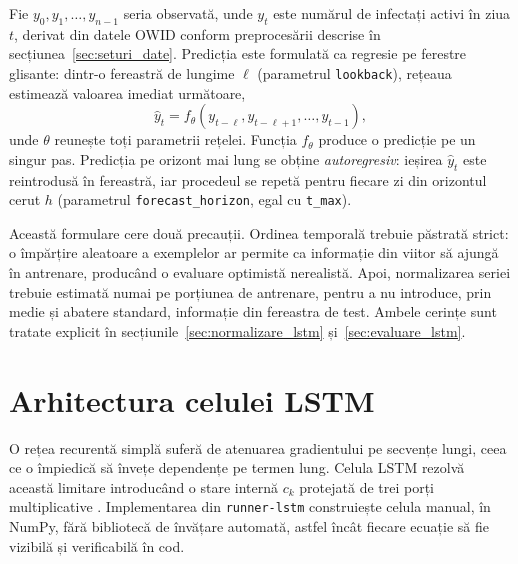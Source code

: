 Fie $y_0, y_1, \ldots, y_{n-1}$ seria observată, unde $y_t$ este numărul de
infectați activi în ziua $t$, derivat din datele OWID conform
preprocesării descrise în secțiunea~\ref{sec:seturi_date}. Predicția este
formulată ca regresie pe ferestre glisante: dintr-o fereastră de lungime $\ell$
(parametrul \texttt{lookback}), rețeaua estimează valoarea imediat următoare,
\begin{equation}
\label{eq:formulare_lstm}
\hat{y}_{t} = f_{\theta}\!\left(y_{t-\ell}, y_{t-\ell+1}, \ldots, y_{t-1}\right),
\end{equation}
unde $\theta$ reunește toți parametrii rețelei. Funcția $f_\theta$ produce o
predicție pe un singur pas. Predicția pe orizont mai lung se obține
\emph{autoregresiv}: ieșirea $\hat{y}_t$ este reintrodusă în fereastră, iar
procedeul se repetă pentru fiecare zi din orizontul cerut $h$ (parametrul
\texttt{forecast\_horizon}, egal cu \texttt{t\_max}).

Această formulare cere două precauții. Ordinea temporală trebuie păstrată
strict: o împărțire aleatoare a exemplelor ar permite ca informație din viitor
să ajungă în antrenare, producând o evaluare optimistă nerealistă. Apoi,
normalizarea seriei trebuie estimată numai pe porțiunea de antrenare, pentru a
nu introduce, prin medie și abatere standard, informație din fereastra de
test. Ambele cerințe sunt tratate explicit în
secțiunile~\ref{sec:normalizare_lstm} și~\ref{sec:evaluare_lstm}.

\section{Arhitectura celulei LSTM}
\label{sec:celula_lstm}

O rețea recurentă simplă suferă de atenuarea gradientului pe secvențe lungi,
ceea ce o împiedică să învețe dependențe pe termen lung. Celula LSTM rezolvă
această limitare introducând o stare internă $c_k$ protejată de trei porți
multiplicative \cite{hochreiter1997lstm}. Implementarea din \texttt{runner-lstm}
construiește celula manual, în NumPy, fără bibliotecă de învățare automată, astfel
încât fiecare ecuație să fie vizibilă și verificabilă în cod.


